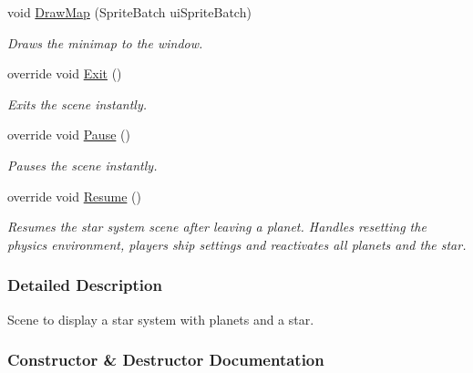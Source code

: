 \begin{DoxyCompactItemize}
void \hyperlink{class_midnight_blue_1_1_star_system_scene_a8ce5e552f65d43e0326644e069dc6c24}{Draw\+Map} (Sprite\+Batch ui\+Sprite\+Batch)
\begin{DoxyCompactList}\small\item\em Draws the minimap to the window. \end{DoxyCompactList}\item 
override void \hyperlink{class_midnight_blue_1_1_star_system_scene_ad533ba93e597964d015099031a85cb77}{Exit} ()
\begin{DoxyCompactList}\small\item\em Exits the scene instantly. \end{DoxyCompactList}\item 
override void \hyperlink{class_midnight_blue_1_1_star_system_scene_a04e8bfcb31eebfd859c4bd543f0bb6f9}{Pause} ()
\begin{DoxyCompactList}\small\item\em Pauses the scene instantly. \end{DoxyCompactList}\item 
override void \hyperlink{class_midnight_blue_1_1_star_system_scene_aefbf0750a7ce153b923bcabb132e4875}{Resume} ()
\begin{DoxyCompactList}\small\item\em Resumes the star system scene after leaving a planet. Handles resetting the physics environment, players ship settings and reactivates all planets and the star. \end{DoxyCompactList}\end{DoxyCompactItemize}


\subsubsection{Detailed Description}
Scene to display a star system with planets and a star. 



\subsubsection{Constructor \& Destructor Documentation}
\hypertarget{class_midnight_blue_1_1_star_system_scene_a630b2de039b719d35fbdf572bbc69ea0}{}\label{class_midnight_blue_1_1_star_system_scene_a630b2de039b719d35fbdf572bbc69ea0} 
